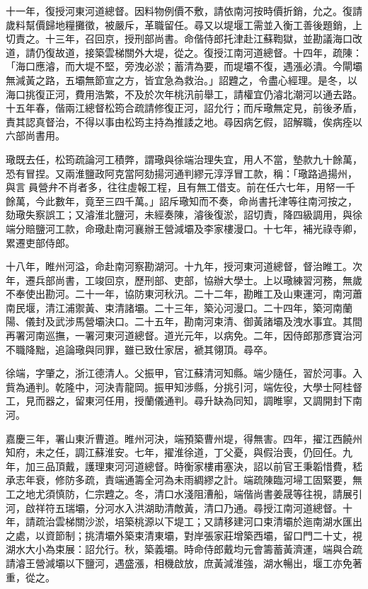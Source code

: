 \begin{pinyinscope}
十一年，復授河東河道總督。因料物例價不敷，請依南河按時價折銷，允之。復請歲料幫價歸地糧攤徵，被嚴斥，革職留任。尋又以堤堰工需並入衡工善後題銷，上切責之。十三年，召回京，授刑部尚書。命偕侍郎托津赴江蘇鞫獄，並勘議海口改道，請仍復故道，接築雲梯關外大堤，從之。復授江南河道總督。十四年，疏陳：「海口應濬，而大堤不堅，旁洩必淤；蓄清為要，而堤壩不復，遇漲必潰。今閘壩無減黃之路，五壩無節宣之方，皆宜急為救治。」詔韙之，令盡心經理。是冬，以海口挑復正河，費用浩繁，不及於次年桃汛前舉工，請權宜仍濬北潮河以通去路。十五年春，偕兩江總督松筠合疏請修復正河，詔允行；而斥璥無定見，前後矛盾，責其認真督治，不得以事由松筠主持為推諉之地。尋因病乞假，詔解職，俟病痊以六部尚書用。

璥既去任，松筠疏論河工積弊，謂璥與徐端治理失宜，用人不當，墊款九十餘萬，恐有冒捏。又兩淮鹽政阿克當阿劾揚河通判繆元淳浮冒工款，稱：「璥路過揚州，與言員營弁不肖者多，往往虛報工程，且有無工借支。前在任六七年，用帑一千餘萬，今此數年，竟至三四千萬。」詔斥璥知而不奏，命尚書托津等往南河按之，劾璥失察誤工；又濬淮北鹽河，未經奏陳，濬後復淤，詔切責，降四級調用，與徐端分賠鹽河工款，命璥赴南河襄辦王營減壩及李家樓漫口。十七年，補光祿寺卿，累遷吏部侍郎。

十八年，睢州河溢，命赴南河察勘湖河。十九年，授河東河道總督，督治睢工。次年，遷兵部尚書，工竣回京，歷刑部、吏部，協辦大學士。上以璥練習河務，無歲不奉使出勘河。二十一年，協防東河秋汛。二十二年，勘睢工及山東運河，南河蕭南民堰，清江浦禦黃、束清諸壩。二十三年，築沁河漫口。二十四年，築河南蘭陽、儀封及武涉馬營壩決口。二十五年，勘南河束清、御黃諸壩及洩水事宜。其間再署河南巡撫，一署河東河道總督。道光元年，以病免。二年，因侍郎那彥寶治河不職降黜，追論璥與同罪，雖已致仕家居，褫其翎頂。尋卒。

徐端，字肇之，浙江德清人。父振甲，官江蘇清河知縣。端少隨任，習於河事。入貲為通判。乾隆中，河決青龍岡。振甲知涉縣，分挑引河，端佐役，大學士阿桂督工，見而器之，留東河任用，授蘭儀通判。尋升缺為同知，調睢寧，又調開封下南河。

嘉慶三年，署山東沂曹道。睢州河決，端預築曹州堤，得無害。四年，擢江西饒州知府，未之任，調江蘇淮安。七年，擢淮徐道，丁父憂，與假治喪，仍回任。九年，加三品頂戴，護理東河河道總督。時衡家樓甫塞決，詔以前官王秉韜惜費，嵇承志年衰，修防多疏，責端通籌全河為未雨綢繆之計。端疏陳臨河埽工固緊要，無工之地尤須慎防，仁宗韙之。冬，清口水淺阻漕船，端偕尚書姜晟等往視，請展引河，啟祥符五瑞壩，分河水入洪湖助清敵黃，清口乃通。尋授江南河道總督。十年，請疏治雲梯關沙淤，培築桃源以下堤工；又請移建河口束清壩於迤南湖水匯出之處，以資節制；挑清壩外築束清東壩，對岸張家莊增築西壩，留口門二十丈，視湖水大小為束展：詔允行。秋，築義壩。時命侍郎戴均元會籌蓄黃濟運，端與合疏請濬王營減壩以下鹽河，遇盛漲，相機啟放，庶黃減淮強，湖水暢出，堰工亦免著重，從之。


\end{pinyinscope}
